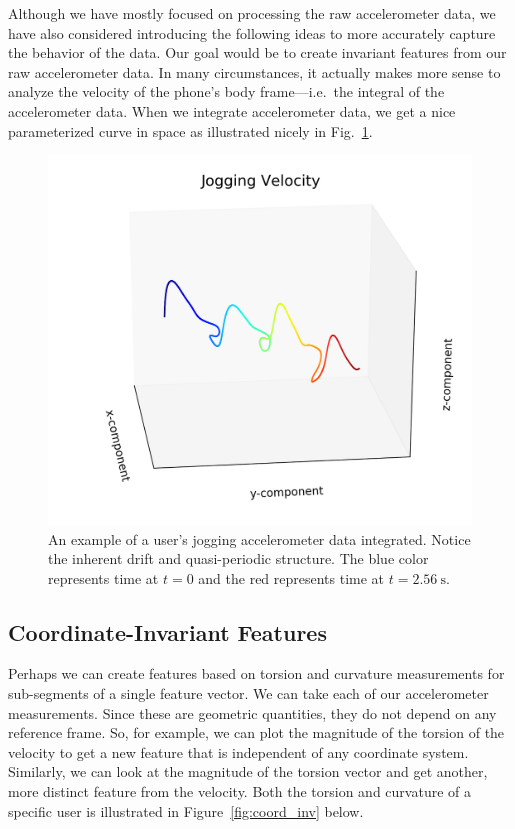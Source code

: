 Although we have mostly focused on processing the raw accelerometer data, we have also considered introducing the following ideas to more accurately capture the behavior of the data. Our goal would be to create invariant features from our raw accelerometer data. In many circumstances, it actually makes more sense to analyze the velocity of the phone's body frame---i.e.\ the integral of the accelerometer data. When we integrate accelerometer data, we get a nice parameterized curve in space as illustrated nicely in Fig.~\ref{fig:jogging_param}.

\begin{figure}[ht]
    \centering
    \includegraphics[width = 0.6 \textwidth]{images/comparisons/jogging.png}
    \caption{An example of a user's jogging accelerometer data integrated. Notice the inherent drift and quasi-periodic structure. The blue color represents time at $t = 0$ and the red represents time at $t = \SI{2.56}{\s}.$  }
    \label{fig:jogging_param}
\end{figure}

\subsection{Coordinate-Invariant Features}
\label{sub:coord_invar}
Perhaps we can create features based on torsion and curvature measurements for sub-segments of a single feature vector. We can take each of our accelerometer measurements. Since these are geometric quantities, they do not depend on any reference frame. So, for example, we can plot the magnitude of the torsion of the velocity to get a new feature that is independent of any coordinate system. Similarly, we can look at the magnitude of the torsion vector and get another, more distinct feature from the velocity. Both the torsion and curvature of a specific user is illustrated in Figure~\ref{fig:coord_inv} below.


